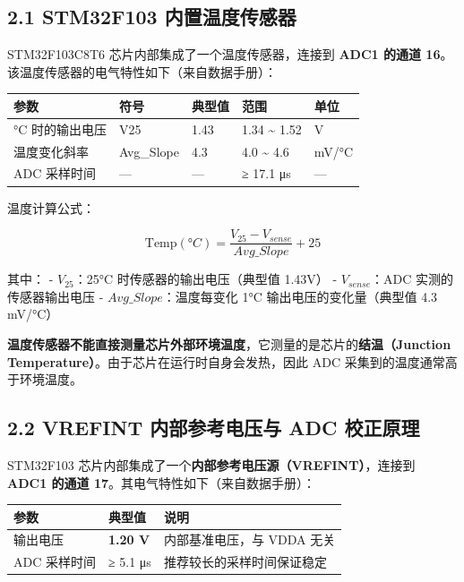 \documentclass[
  chinese,
  UTF8,
  oneside,
  openany]{ctexbook}
\begin{document}
\subsection{2.1 STM32F103
内置温度传感器}\label{stm32f103-ux5185ux7f6eux6e29ux5ea6ux4f20ux611fux5668}

STM32F103C8T6 芯片内部集成了一个温度传感器，连接到 \textbf{ADC1 的通道
16}。该温度传感器的电气特性如下（来自数据手册）：

\begin{longtable}[]{@{}lllll@{}}
\toprule\noalign{}
参数 & 符号 & 典型值 & 范围 & 单位 \\
\midrule\noalign{}
\endhead
\bottomrule\noalign{}
\endlastfoot
25°C 时的输出电压 & V25 & 1.43 & 1.34 \textasciitilde{} 1.52 & V \\
温度变化斜率 & Avg\_Slope & 4.3 & 4.0 \textasciitilde{} 4.6 & mV/°C \\
ADC 采样时间 & --- & --- & ≥ 17.1 μs & --- \\
\end{longtable}

温度计算公式：

\[\text{Temp}(°C) = \frac{V_{25} - V_{sense}}{Avg\_Slope} + 25\]

其中： - \(V_{25}\)：25°C 时传感器的输出电压（典型值 1.43V） -
\(V_{sense}\)：ADC 实测的传感器输出电压 - \(Avg\_Slope\)：温度每变化 1°C
输出电压的变化量（典型值 4.3 mV/°C）

\textbf{温度传感器不能直接测量芯片外部环境温度}，它测量的是芯片的\textbf{结温（Junction
Temperature）}。由于芯片在运行时自身会发热，因此 ADC
采集到的温度通常高于环境温度。

\subsection{2.2 VREFINT 内部参考电压与 ADC
校正原理}\label{vrefint-ux5185ux90e8ux53c2ux8003ux7535ux538bux4e0e-adc-ux6821ux6b63ux539fux7406}

STM32F103 芯片内部集成了一个\textbf{内部参考电压源（VREFINT）}，连接到
\textbf{ADC1 的通道 17}。其电气特性如下（来自数据手册）：

\begin{longtable}[]{@{}lll@{}}
\toprule\noalign{}
参数 & 典型值 & 说明 \\
\midrule\noalign{}
\endhead
\bottomrule\noalign{}
\endlastfoot
输出电压 & \textbf{1.20 V} & 内部基准电压，与 VDDA 无关 \\
ADC 采样时间 & ≥ 5.1 μs & 推荐较长的采样时间保证稳定 \\
\end{longtable}
\end{document}
